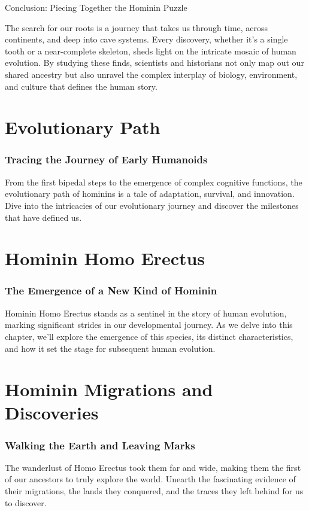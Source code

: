 \documentclass[a4paper,12pt]{book}
\begin{document}
Conclusion: Piecing Together the Hominin Puzzle

The search for our roots is a journey that takes us through time, across continents, and deep into cave systems. Every discovery, whether it's a single tooth or a near-complete skeleton, sheds light on the intricate mosaic of human evolution. By studying these finds, scientists and historians not only map out our shared ancestry but also unravel the complex interplay of biology, environment, and culture that defines the human story.


\chapter{Evolutionary Path}
\subsection*{Tracing the Journey of Early Humanoids}
From the first bipedal steps to the emergence of complex cognitive functions, the evolutionary path of hominins is a tale of adaptation, survival, and innovation. Dive into the intricacies of our evolutionary journey and discover the milestones that have defined us.

\chapter{Hominin Homo Erectus}
\subsection*{The Emergence of a New Kind of Hominin}
Hominin Homo Erectus stands as a sentinel in the story of human evolution, marking significant strides in our developmental journey. As we delve into this chapter, we'll explore the emergence of this species, its distinct characteristics, and how it set the stage for subsequent human evolution.

\chapter{Hominin Migrations and Discoveries}
\subsection*{Walking the Earth and Leaving Marks}
The wanderlust of Homo Erectus took them far and wide, making them the first of our ancestors to truly explore the world. Unearth the fascinating evidence of their migrations, the lands they conquered, and the traces they left behind for us to discover.
\end{document}
